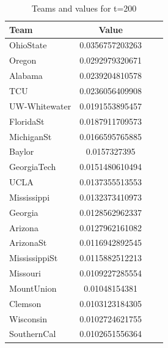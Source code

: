 \documentclass[11pt]{article}
\begin{document}
\begin{table}[!th]
\centering
\begin{tabular}{|l|c|cl}
\hline
Team & Value \\
\hline
OhioState & 0.0356757203263 \\
Oregon & 0.0292979320671 \\
Alabama & 0.0239204810578 \\
TCU & 0.0236056409908 \\
UW-Whitewater & 0.0191553895457 \\
FloridaSt & 0.0187911709573 \\
MichiganSt & 0.0166595765885 \\
Baylor & 0.0157327395 \\
GeorgiaTech & 0.0151480610494 \\
UCLA & 0.0137355513553 \\
Mississippi & 0.0132373410973 \\
Georgia & 0.0128562962337 \\
Arizona & 0.0127962161082 \\
ArizonaSt & 0.0116942892545 \\
MississippiSt & 0.0115882512213 \\
Missouri & 0.0109227285554 \\
MountUnion & 0.01048154381 \\
Clemson & 0.0103123184305 \\
Wisconsin & 0.0102724621755 \\
SouthernCal & 0.0102651556364 \\
\hline
\end{tabular}
\caption{Teams and values for t=200}
\label{ex:table}
\end{table}
\end{document}
